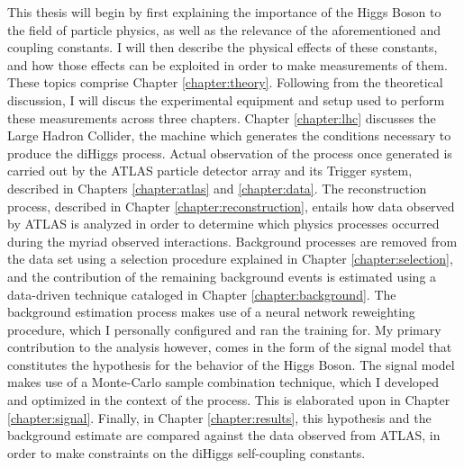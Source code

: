 This thesis will begin by first explaining the importance of the Higgs Boson to the field of particle physics,
    as well as the relevance of the aforementioned \kl and \kvv coupling constants.
I will then describe the physical effects of these constants,
    and how those effects can be exploited in order to make measurements of them.
These topics comprise Chapter \ref{chapter:theory}.
Following from the theoretical discussion,
    I will discus the experimental equipment and setup used to perform these measurements across three chapters.
Chapter \ref{chapter:lhc} discusses the Large Hadron Collider, the machine which generates the conditions necessary to produce the diHiggs process.
Actual observation of the process once generated is carried out by the ATLAS particle detector array and its Trigger system,
    described in Chapters \ref{chapter:atlas} and \ref{chapter:data}.
The reconstruction process, described in Chapter \ref{chapter:reconstruction},
    entails how data observed by ATLAS is analyzed in order to determine which physics processes occurred during the myriad observed interactions.
Background processes are removed from the data set using a selection procedure explained in Chapter \ref{chapter:selection},
    and the contribution of the remaining background events is estimated using a data-driven technique cataloged in Chapter \ref{chapter:background}. 
The background estimation process makes use of a neural network reweighting procedure, which I personally configured and ran the training for.
My primary contribution to the analysis however, comes in the form of the signal model that constitutes the hypothesis for the behavior of the Higgs Boson.
The signal model makes use of a Monte-Carlo sample combination technique, which I developed and optimized in the context of the \vbfproc process.
This is elaborated upon in Chapter \ref{chapter:signal}.
Finally, in Chapter \ref{chapter:results}, this hypothesis and the background estimate are compared against the data observed from ATLAS,
    in order to make constraints on the diHiggs self-coupling constants.


%
